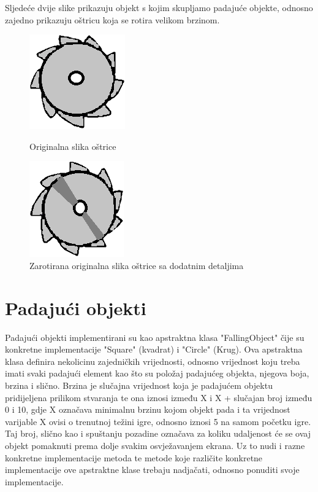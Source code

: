 \documentclass[times, utf8, zavrsni, numeric]{fer}
\begin{document}
	Sljedeće dvije slike prikazuju objekt s kojim skupljamo padajuće objekte, odnosno zajedno prikazuju oštricu koja se rotira velikom brzinom.
	
		\begin{figure}[!htb]
			\begin{minipage}{0.48\textwidth}
				\centering
				\includegraphics[scale=0.6]{"slike/saw1.png"} 
				\caption{Originalna slika oštrice}
				\label{fig:saw1}
			\end{minipage}\hfill
			\begin{minipage}{0.48\textwidth}
				\centering
				\includegraphics[scale=0.6]{"slike/saw2.png"} 
				\caption{Zarotirana originalna slika oštrice sa dodatnim detaljima}
				\label{fig:saw2}
			\end{minipage}
		\end{figure}
	
	\section{Padajući objekti}
	Padajući objekti implementirani su kao apstraktna klasa "FallingObject" čije su konkretne implementacije "Square" (kvadrat) i "Circle" (Krug). Ova apstraktna klasa definira nekolicinu zajedničkih vrijednosti, 
	odnosno vrijednost koju treba imati svaki padajući element kao što su položaj padajućeg objekta, njegova boja, brzina i slično.
	Brzina je slučajna vrijednost koja je padajućem objektu pridijeljena prilikom stvaranja te ona iznosi između X i X + slučajan broj između 0 i 10, gdje X označava minimalnu brzinu kojom objekt pada i ta vrijednost
	varijable X ovisi o trenutnoj težini igre, odnosno iznosi 5 na samom početku igre. Taj broj, slično kao i spuštanju pozadine označava za koliku udaljenost će se ovaj objekt pomaknuti prema dolje svakim osvježavanjem ekrana.
	Uz to nudi i razne konkretne implementacije metoda te metode koje različite konkretne implementacije ove apstraktne klase trebaju nadjačati, odnosno ponuditi svoje implementacije. 
	
\end{document}
